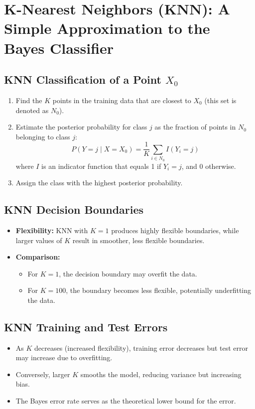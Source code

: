 \documentclass[12pt]{article}
\begin{document}
\section{K-Nearest Neighbors (KNN): A Simple Approximation to the Bayes Classifier}

\subsection{KNN Classification of a Point $X_0$}

\begin{enumerate}
    \item Find the $K$ points in the training data that are closest to $X_0$ (this set is denoted as $N_0$).
    \item Estimate the posterior probability for class $j$ as the fraction of points in $N_0$ belonging to class $j$:
    \[
    P(Y = j \mid X = X_0) = \frac{1}{K} \sum_{i \in N_0} I(Y_i = j)
    \]
    where $I$ is an indicator function that equals 1 if $Y_i = j$, and 0 otherwise.
    \item Assign the class with the highest posterior probability.
\end{enumerate}

\subsection{KNN Decision Boundaries}

\begin{itemize}
    \item \textbf{Flexibility:} KNN with $K=1$ produces highly flexible boundaries, while larger values of $K$ result in smoother, less flexible boundaries.
    \item \textbf{Comparison:}
    \begin{itemize}
        \item For $K=1$, the decision boundary may overfit the data.
        \item For $K=100$, the boundary becomes less flexible, potentially underfitting the data.
    \end{itemize}
\end{itemize}

\subsection{KNN Training and Test Errors}

\begin{itemize}
    \item As $K$ decreases (increased flexibility), training error decreases but test error may increase due to overfitting.
    \item Conversely, larger $K$ smooths the model, reducing variance but increasing bias.
    \item The Bayes error rate serves as the theoretical lower bound for the error.
\end{itemize}
\end{document}

